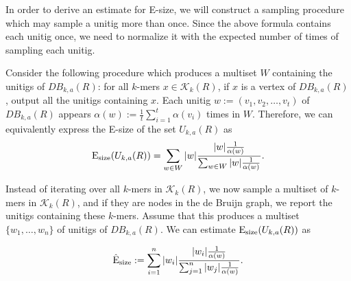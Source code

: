 \documentclass[a4paper,11pt]{article}
\newcommand{\DB}{DB_{k,a}}
\newcommand{\esize}{{\rm E_{size}}}
\begin{document}
In order to derive an estimate for E-size, we will construct a sampling procedure which may sample a unitig more than once. Since the above formula contains each unitig once, we need to normalize it with the expected number of times of sampling each unitig.

Consider the following procedure which produces a multiset $W$ containing the unitigs of $\DB(R)$: for all $k$-mers $x \in \mathcal{K}_k(R)$, if $x$ is a vertex of $\DB(R)$, output all the unitigs containing $x$. Each unitig $w := (v_1,v_2,\dots,v_t)$ of $\DB(R)$ appears $\alpha(w) := \frac{1}{t}\sum_{i = 1}^{t}\alpha(v_i)$ times in $W$. Therefore, we can equivalently express the E-size of the set $U_{k,a}(R)$ as 
\[\esize(U_{k,a}(R)) = \sum_{w \in W} |w| \frac{|w|\frac{1}{\alpha(w)}}{\sum_{w \in W}|w|\frac{1}{\alpha(w)}}.\]

Instead of iterating over all $k$-mers in $\mathcal{K}_k(R)$, we now sample a multiset of $k$-mers in $\mathcal{K}_k(R)$, and if they are nodes in the de Bruijn graph, we report the unitigs containing these $k$-mers. Assume that this produces a multiset $\{w_1,\dots,w_n\}$ of unitigs of $\DB(R)$. We can estimate $\esize(U_{k,a}(R))$ as 

\[\hat{{\rm E}}_{\rm size} := \sum_{i = 1}^{n} |w_i| \frac{|w_i|\frac{1}{\alpha(w)}}{\sum_{j=1}^{n}|w_j|\frac{1}{\alpha(w)}}.\]





\end{document}
